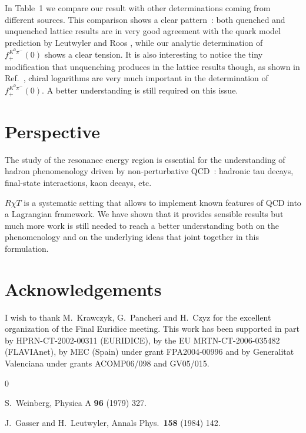 \documentclass{appolb}
\begin{document}
{In Table~1 we compare our result with other determinations coming from different sources. 
This comparison shows a clear pattern~: both quenched and unquenched lattice results are in very good agreement with
the quark model prediction by Leutwyler and Roos \cite{Leutwyler:1984je}, while our analytic determination of 
$f_{+}^{K^0 \pi^-}(0)$ shows a clear tension. It is also 
interesting to notice the tiny modification that unquenching produces in the lattice results though, as shown in 
Ref.~\cite{Bijnens:2003uy}, chiral logarithms are very much important in the determination of $f_{+}^{K^0 \pi^-}(0)$.
A better understanding is still required on this issue.

\section{Perspective}
The study of the resonance energy region is essential
for the understanding of hadron phenomenology driven by non-perturbative QCD~: hadronic tau decays, final-state
interactions, kaon decays, etc.
\par
$R \chi T$ is a systematic setting that allows to implement known features of QCD into a Lagrangian framework. We have
shown that it provides sensible results but much more work is still needed to reach a better understanding both on the
phenomenology and on the underlying ideas that joint together in this formulation. 

\section*{Acknowledgements}
I wish to thank M.~Krawczyk, G.~Pancheri and H.~Czyz for the excellent organization of the Final Euridice meeting.
This work has been supported in part by HPRN-CT-2002-00311 (EURIDICE), by the EU MRTN-CT-2006-035482 (FLAVIAnet), 
by MEC (Spain) under grant FPA2004-00996 and
by Generalitat Valenciana under grants ACOMP06/098 and GV05/015.

\begin{thebibliography}{0}

  S.~Weinberg,
  Physica A {\bf 96} (1979) 327.
  
  J.~Gasser and H.~Leutwyler,
  Annals Phys.\  {\bf 158} (1984) 142.
  

\end{thebibliography}}
\end{document}
